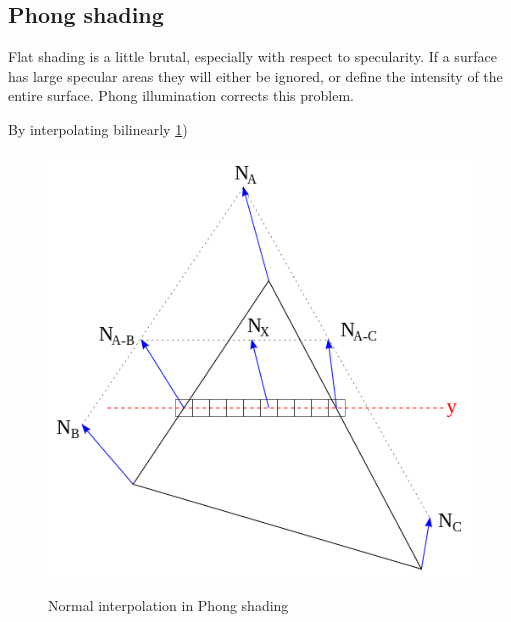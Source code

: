 \subsection{Phong shading}
Flat shading is a little brutal, especially with respect to specularity. If a
surface has large specular areas they will either be ignored, or define the
intensity of the entire surface. Phong illumination corrects this problem.

By interpolating bilinearly
\ref{fig:phongInterpo})

\begin{figure}[H]
\includegraphics{pics/phongInterpol.png}
\label{fig:phongInterpo}
\caption{Normal interpolation in Phong shading}
\end{figure}
